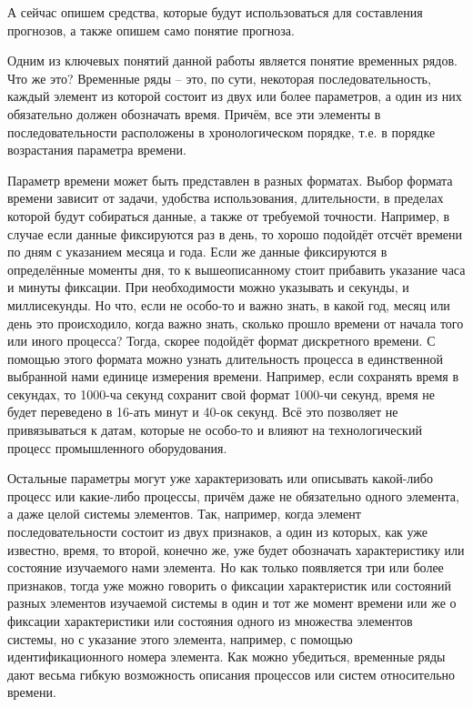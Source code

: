 {\gostFont

  \par \redline А сейчас опишем средства, которые будут использоваться для составления прогнозов, а также опишем само понятие прогноза.

  \par \redline Одним из ключевых понятий данной работы является понятие временных рядов. Что же это? Временные ряды {--} это, по сути, некоторая последовательность, каждый элемент из которой состоит из двух или более параметров, а один из них обязательно должен обозначать время. Причём, все эти элементы в последовательности расположены в хронологическом порядке, т.е. в порядке возрастания параметра времени.

  \par \redline Параметр времени может быть представлен в разных форматах. Выбор формата времени зависит от задачи, удобства использования, длительности, в пределах которой будут собираться данные, а также от требуемой точности. Например, в случае если данные фиксируются раз в день, то хорошо подойдёт отсчёт времени по дням с указанием месяца и года. Если же данные фиксируются в определённые моменты дня, то к вышеописанному стоит прибавить указание часа и минуты фиксации. При необходимости можно указывать и секунды, и миллисекунды. Но что, если не особо-то и важно знать, в какой год, месяц или день это происходило, когда важно знать, сколько прошло времени от начала того или иного процесса? Тогда, скорее подойдёт формат дискретного времени. С помощью этого формата можно узнать длительность процесса в единственной выбранной нами единице измерения времени. Например, если сохранять время в секундах, то 1000-ча секунд сохранит свой формат 1000-чи секунд, время не будет переведено в 16-ать минут и 40-ок секунд. Всё это позволяет не привязываться к датам, которые не особо-то и влияют на технологический процесс промышленного оборудования.

  \par \redline Остальные параметры могут уже характеризовать или описывать какой-либо процесс или какие-либо процессы, причём даже не обязательно одного элемента, а даже целой системы элементов. Так, например, когда элемент последовательности состоит из двух признаков, а один из которых, как уже известно, время, то второй, конечно же, уже будет обозначать характеристику или состояние изучаемого нами элемента. Но как только появляется три или более признаков, тогда уже можно говорить о фиксации характеристик или состояний разных элементов изучаемой системы в один и тот же момент времени или же о фиксации характеристики или состояния одного из множества элементов системы, но с указание этого элемента, например, с помощью идентификационного номера элемента. Как можно убедиться, временные ряды дают весьма гибкую возможность описания процессов или систем относительно времени. 

}
